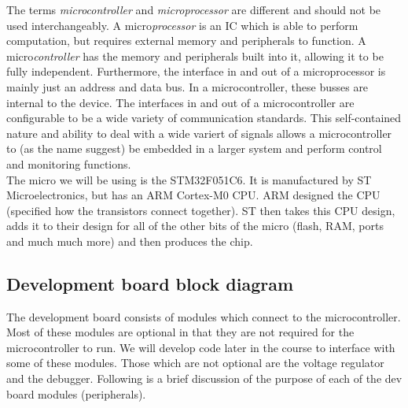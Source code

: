 \begin{table}
\caption{Comparison of specs of entry level computer to STM32F051C6.}
\label{table:specs_comp}
\end{table}

The terms \textit{microcontroller} and \textit{microprocessor} are different and should not be used interchangeably. A micro\textit{processor} is an IC which is able to perform computation, but requires external memory and peripherals to function. A micro\textit{controller} has the memory and peripherals built into it, allowing it to be fully independent. Furthermore, the interface in and out of a microprocessor is mainly just an address and data bus. In a microcontroller, these busses are internal to the device. The interfaces in and out of a microcontroller are configurable to be a wide variety of communication standards. This self-contained nature and ability to deal with a wide variert of signals allows a microcontroller to (as the name suggest) be embedded in a larger system and perform control and monitoring functions.\\

The micro we will be using is the STM32F051C6. It is manufactured by ST Microelectronics, but has an ARM Cortex-M0 CPU. ARM designed the CPU (specified how the transistors connect together). ST then takes this CPU design, adds it to their design for all of the other bits of the micro (flash, RAM, ports and much much more) and then produces the chip.

\subsection{Development board block diagram}
The development board consists of modules which connect to the microcontroller. Most of these modules are optional in that they are not required for the microcontroller to run. We will develop code later in the course to interface with some of these modules. Those which are not optional are the voltage regulator and the debugger.
Following is a brief discussion of the purpose of each of the dev board modules (peripherals).

